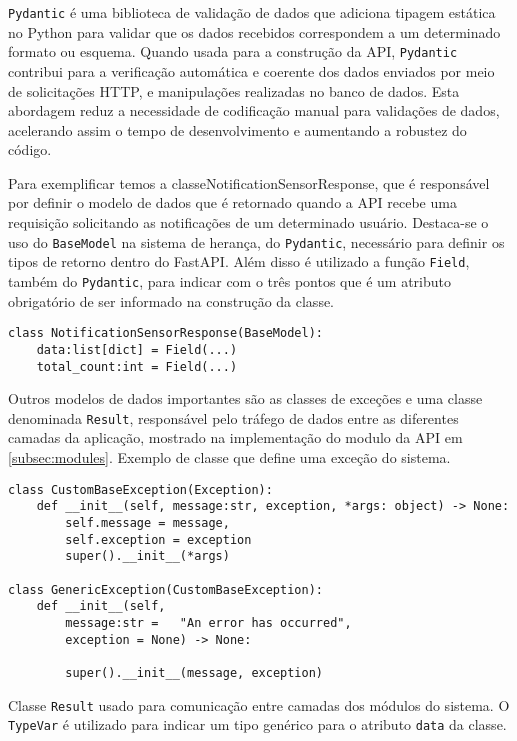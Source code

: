 \texttt{Pydantic} \cite{pydanticDocs} é uma biblioteca de validação de dados que adiciona tipagem estática no Python para validar que os dados recebidos correspondem a um determinado formato ou esquema. Quando usada para a construção da \gls{API}, \texttt{Pydantic} contribui para a verificação automática e coerente dos dados enviados por meio de solicitações \gls{HTTP}, e manipulações realizadas no banco de dados. Esta abordagem reduz a necessidade de codificação manual para validações de dados, acelerando assim o tempo de desenvolvimento e aumentando a robustez do código.

Para exemplificar temos a  classeNotificationSensorResponse, que é responsável por definir o modelo de dados que é retornado quando a \gls{API} recebe uma requisição solicitando as notificações de um determinado usuário. Destaca-se o uso do \texttt{BaseModel} na sistema de herança, do \texttt{Pydantic}, necessário para definir os tipos de retorno dentro do FastAPI. Além disso é utilizado a função \texttt{Field}, também do \texttt{Pydantic}, para indicar com o três pontos que é um atributo obrigatório de ser informado na construção da classe.

\begin{verbatim}
class NotificationSensorResponse(BaseModel):
    data:list[dict] = Field(...)
    total_count:int = Field(...)
\end{verbatim}

Outros modelos de dados importantes são as classes de exceções e uma classe denominada \texttt{Result}, responsável pelo tráfego de dados entre as diferentes camadas da aplicação, mostrado na implementação do modulo da \gls{API} em \ref{subsec:modules}.
Exemplo de classe que define uma exceção do sistema.
\begin{verbatim}
class CustomBaseException(Exception):
    def __init__(self, message:str, exception, *args: object) -> None:
        self.message = message,
        self.exception = exception
        super().__init__(*args)

class GenericException(CustomBaseException):
    def __init__(self,
        message:str =   "An error has occurred",
        exception = None) -> None:

        super().__init__(message, exception)
\end{verbatim}


Classe \texttt{Result} usado para comunicação entre camadas dos módulos do sistema. O \texttt{TypeVar} é utilizado para indicar um tipo genérico para o atributo \texttt{data} da classe.

